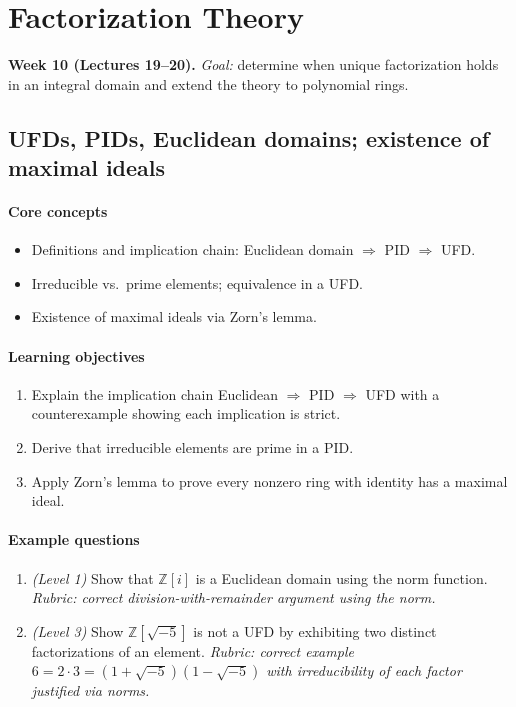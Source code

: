 \documentclass{article}
\begin{document}
\section{Factorization Theory}
\textbf{Week 10 (Lectures 19--20).} \emph{Goal:} determine when unique factorization holds in an integral domain and extend the theory to polynomial rings.

\subsection{UFDs, PIDs, Euclidean domains; existence of maximal ideals}
\paragraph{Core concepts}
\begin{itemize}[nosep]
  \item Definitions and implication chain: Euclidean domain $\Rightarrow$ PID $\Rightarrow$ UFD.
  \item Irreducible vs.\ prime elements; equivalence in a UFD.
  \item Existence of maximal ideals via Zorn's lemma.
\end{itemize}
\paragraph{Learning objectives}
\begin{enumerate}[nosep]
  \item Explain the implication chain Euclidean $\Rightarrow$ PID $\Rightarrow$ UFD with a counterexample showing each implication is strict.
  \item Derive that irreducible elements are prime in a PID.
  \item Apply Zorn's lemma to prove every nonzero ring with identity has a maximal ideal.
\end{enumerate}
\paragraph{Example questions}
\begin{enumerate}[nosep]
  \item \emph{(Level 1)} Show that $\mathbb{Z}[i]$ is a Euclidean domain using the norm function. \emph{Rubric: correct division-with-remainder argument using the norm.}
  \item \emph{(Level 3)} Show $\mathbb{Z}[\sqrt{-5}]$ is not a UFD by exhibiting two distinct factorizations of an element. \emph{Rubric: correct example $6 = 2\cdot 3 = (1+\sqrt{-5})(1-\sqrt{-5})$ with irreducibility of each factor justified via norms.}
\end{enumerate}
\end{document}
